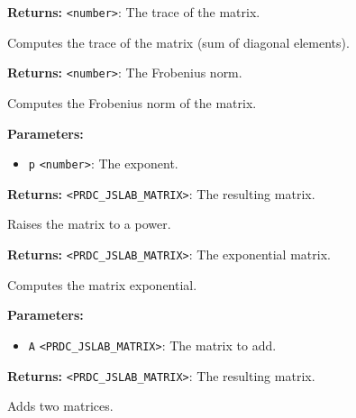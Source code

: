 \documentclass[12pt,a4paper]{article}
\begin{document}
\noindent \textbf{Returns:} \texttt{<number>}: The trace of the matrix.

\noindent Computes the trace of the matrix (sum of diagonal elements).

\vspace{5mm}
\noindent {}


\noindent \textbf{Returns:} \texttt{<number>}: The Frobenius norm.

\noindent Computes the Frobenius norm of the matrix.

\vspace{5mm}
\noindent {}


\noindent \textbf{Parameters:}
\begin{itemize}
  \item \texttt{p} \texttt{<number>}: The exponent.
\end{itemize}

\noindent \textbf{Returns:} \texttt{<PRDC\_JSLAB\_MATRIX>}: The resulting matrix.

\noindent Raises the matrix to a power.

\vspace{5mm}
\noindent {}


\noindent \textbf{Returns:} \texttt{<PRDC\_JSLAB\_MATRIX>}: The exponential matrix.

\noindent Computes the matrix exponential.

\vspace{5mm}
\noindent {}


\noindent \textbf{Parameters:}
\begin{itemize}
  \item \texttt{A} \texttt{<PRDC\_JSLAB\_MATRIX>}: The matrix to add.
\end{itemize}

\noindent \textbf{Returns:} \texttt{<PRDC\_JSLAB\_MATRIX>}: The resulting matrix.

\noindent Adds two matrices.
\end{document}
